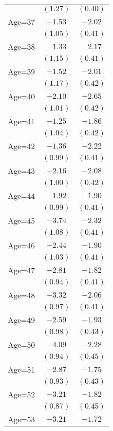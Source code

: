 \documentclass[fullpage]{paper}
\begin{document}
\begin{center}
\begin{longtable}{l c c }
            & $(1.27)$ & $(0.40)$ \\
Age=37      & $-1.53$  & $-2.02$  \\
            & $(1.05)$ & $(0.41)$ \\
Age=38      & $-1.33$  & $-2.17$  \\
            & $(1.15)$ & $(0.41)$ \\
Age=39      & $-1.52$  & $-2.01$  \\
            & $(1.17)$ & $(0.42)$ \\
Age=40      & $-2.10$  & $-2.65$  \\
            & $(1.01)$ & $(0.42)$ \\
Age=41      & $-1.25$  & $-1.86$  \\
            & $(1.04)$ & $(0.42)$ \\
Age=42      & $-1.36$  & $-2.22$  \\
            & $(0.99)$ & $(0.41)$ \\
Age=43      & $-2.16$  & $-2.08$  \\
            & $(1.00)$ & $(0.42)$ \\
Age=44      & $-1.92$  & $-1.90$  \\
            & $(0.99)$ & $(0.41)$ \\
Age=45      & $-3.74$  & $-2.32$  \\
            & $(1.08)$ & $(0.41)$ \\
Age=46      & $-2.44$  & $-1.90$  \\
            & $(1.03)$ & $(0.41)$ \\
Age=47      & $-2.81$  & $-1.82$  \\
            & $(0.94)$ & $(0.41)$ \\
Age=48      & $-3.32$  & $-2.06$  \\
            & $(0.97)$ & $(0.41)$ \\
Age=49      & $-2.59$  & $-1.93$  \\
            & $(0.98)$ & $(0.43)$ \\
Age=50      & $-4.09$  & $-2.28$  \\
            & $(0.94)$ & $(0.45)$ \\
Age=51      & $-2.87$  & $-1.75$  \\
            & $(0.93)$ & $(0.43)$ \\
Age=52      & $-3.21$  & $-1.82$  \\
            & $(0.87)$ & $(0.45)$ \\
Age=53      & $-3.21$  & $-1.72$  \\

\end{longtable}
\end{center}
\end{document}
